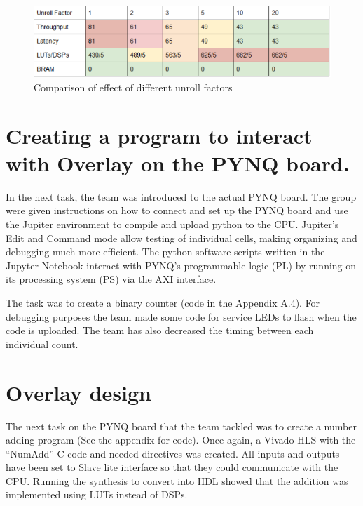 \begin{figure}[h]
\centering
\includegraphics[scale=1]{unrolltable}
\caption{Comparison of effect of different unroll factors}
\label{unrolltable}
\end{figure}


\section{Creating a program to interact with Overlay on the PYNQ board.}

In the next task, the team was introduced to the actual PYNQ board. The group were given instructions on how to connect and set up the PYNQ board and use the Jupiter environment to compile and upload python to the CPU. Jupiter’s Edit and Command mode allow testing of  individual cells, making organizing and debugging much more efficient. The python software scripts written in the Jupyter Notebook interact with PYNQ’s programmable logic (PL) by running on its processing system (PS) via the AXI interface.\cite[p.6]{crockettelliottenderwitzstewart2014}

The task was to create a binary counter (code in the Appendix A.4). For debugging purposes the team made some code for service LEDs to flash when the code is uploaded. The team has also decreased the timing between each individual count.


\section{Overlay design}

The next task on the PYNQ board that the team tackled was to create a number adding program (See the appendix for code). Once again, a Vivado HLS with the “NumAdd” C code and needed directives was created. All inputs and outputs have been set to Slave lite interface so that they could communicate with the CPU\cite[p.299]{crockettelliottenderwitzstewart2014}. Running the synthesis to convert into HDL showed that the addition was implemented using LUTs instead of DSPs. 


